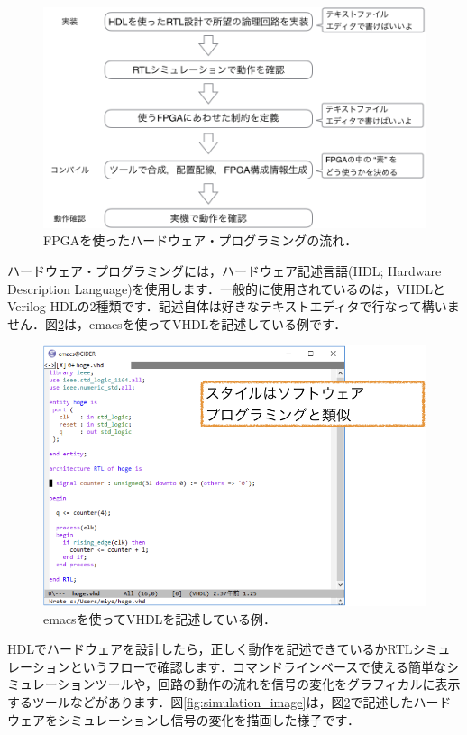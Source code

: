 \documentclass[a4paper,dvipdfmx]{jsarticle}
\begin{document}
 \begin{figure}[H]
  \begin{center}
   \includegraphics[width=.8\textwidth]{chapter01_figures/fpga_development_flow.png}
  \end{center}
  \caption{FPGAを使ったハードウェア・プログラミングの流れ．\label{fig:fpga_development_flow}}
 \end{figure}

ハードウェア・プログラミングには，ハードウェア記述言語(HDL; Hardware Description Language)を使用します．一般的に使用されているのは，VHDLとVerilog HDLの2種類です．記述自体は好きなテキストエディタで行なって構いません．図\ref{fig:writing_vhdl_example}は，emacsを使ってVHDLを記述している例です．

 \begin{figure}[H]
  \begin{center}
   \includegraphics[width=.8\textwidth]{chapter01_figures/writing_vhdl_example.png}
  \end{center}
  \caption{emacsを使ってVHDLを記述している例．\label{fig:writing_vhdl_example}}
 \end{figure}

HDLでハードウェアを設計したら，正しく動作を記述できているかRTLシミュレーションというフローで確認します．コマンドラインベースで使える簡単なシミュレーションツールや，回路の動作の流れを信号の変化をグラフィカルに表示するツールなどがあります．図\ref{fig:simulation_image}は，図\ref{fig:writing_vhdl_example}で記述したハードウェアをシミュレーションし信号の変化を描画した様子です．
\end{document}
